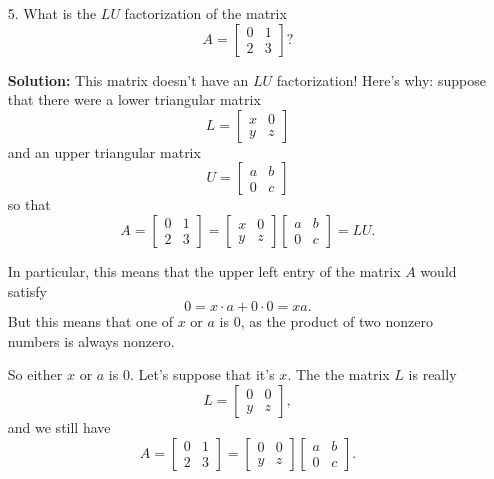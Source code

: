 \documentclass[11pt]{article}
\begin{document}
\begin{enumerate}
%
%
\item[5.] What is the $LU$ factorization of the matrix
\[A = \begin{bmatrix} 0 & 1 \\ 2 & 3 \end{bmatrix}? \]

\textbf{Solution:} This matrix doesn't have an $LU$ factorization!  Here's why: suppose that there were a lower triangular matrix
\[L = \begin{bmatrix} x & 0 \\ y & z \end{bmatrix} \]
and an upper triangular matrix 
\[U = \begin{bmatrix} a & b \\ 0 & c \end{bmatrix}\]
so that
\[A = \begin{bmatrix} 0 & 1 \\ 2 & 3 \end{bmatrix} = \begin{bmatrix} x & 0 \\ y & z \end{bmatrix}\begin{bmatrix} a & b \\ 0 & c \end{bmatrix} = LU. \]

In particular, this means that the upper left entry of the matrix $A$ would satisfy
\[0 = x \cdot a + 0 \cdot 0 = xa. \] 
But this means that one of $x$ or $a$ is $0$, as the product of two nonzero numbers is always nonzero.

So either $x$ or $a$ is $0$.  Let's suppose that it's $x$.  The the matrix $L$ is really
\[L = \begin{bmatrix} 0 & 0 \\ y & z \end{bmatrix}, \]
and we still have
\[A = \begin{bmatrix} 0 & 1 \\ 2 & 3 \end{bmatrix} = \begin{bmatrix} 0 & 0 \\ y & z \end{bmatrix}\begin{bmatrix} a & b \\ 0 & c \end{bmatrix}.\]


\end{enumerate}
\end{document}
